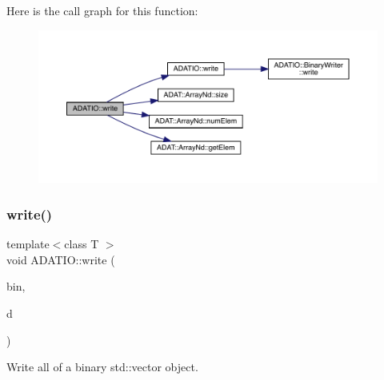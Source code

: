 Here is the call graph for this function\+:
\nopagebreak
\begin{figure}[H]
\begin{center}
\leavevmode
\includegraphics[width=350pt]{d0/dba/namespaceADATIO_a0f804d3b56353fad83984a5668212660_cgraph}
\end{center}
\end{figure}
\mbox{\label{namespaceADATIO_a588c700d58adcb2b77399ac18ec9226b}} 
\subsubsection{\texorpdfstring{write()}{write()}\hspace{0.1cm}{\footnotesize\ttfamily [21/25]}}
{\footnotesize\ttfamily template$<$class T $>$ \\
void A\+D\+A\+T\+I\+O\+::write (\begin{DoxyParamCaption}\item[{\mbox{\hyperlink{classADATIO_1_1BinaryWriter}{Binary\+Writer}} \&}]{bin,  }\item[{const std\+::vector$<$ T $>$ \&}]{d }\end{DoxyParamCaption})\hspace{0.3cm}{\ttfamily [inline]}}



Write all of a binary std\+::vector object. 

